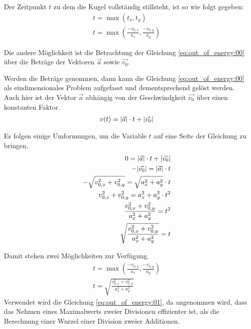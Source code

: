 Der Zeitpunkt $t$ zu dem die Kugel vollständig stillsteht, ist so wie folgt gegeben:
\begin{align}
    t = \max{(t_x, t_y)}\\
    t = \max{(\frac{-v_{0,x}}{a_x}, \frac{-v_{0,y}}{a_y})}
\end{align}

Die andere Möglichkeit ist die Betrachtung der Gleichung \ref{eq:out_of_energy:00} über die Beträge der Vektoren
$\vec{a}$ sowie $\vec{v_0}$.

Werden die Beträge genommen, dann kann die Gleichung \ref{eq:out_of_energy:00} als eindimensionales Problem aufgefasst und
dementsprechend gelöst werden. Auch hier ist der Vektor $\vec{a}$ abhängig von der Geschwindgkeit $\vec{v_0}$ über einen
konstanten Faktor.
\begin{align}
    v(t) = \lvert \vec{a} \rvert \cdot t + \lvert \vec{v_0} \rvert
\end{align}

Es folgen einige Umformungen, um die Variable $t$ auf eine Seite der Gleichung zu bringen.
\begin{align}
    0 = \lvert \vec{a} \rvert \cdot t + \lvert \vec{v_0} \rvert\\
    -\lvert \vec{v_0} \rvert = \lvert \vec{a} \rvert \cdot t\\
    -\sqrt{v_{0,x}^2 + v_{0,y}^2} = \sqrt{a_x^2 + a_y^2} \cdot t\\
    v_{0,x}^2 + v_{0,y}^2 = a_x^2 + a_y^2 \cdot t^2\\
    \frac{v_{0,x}^2 + v_{0,y}^2}{a_x^2 + a_y^2} = t^2\\
    \sqrt{\frac{v_{0,x}^2 + v_{0,y}^2}{a_x^2 + a_y^2}} = t
\end{align}

Damit stehen zwei Möglichkeiten zur Verfügung.
\begin{align}
    t = \max{(\frac{-v_{0,x}}{a_x}, \frac{-v_{0,y}}{a_y})}\\
    t = \sqrt{\frac{v_{0,x}^2 + v_{0,y}^2}{a_x^2 + a_y^2}}
\end{align}
Verwendet wird die Gleichung \ref{eq:out_of_energy:01}, da angenommen wird, dass das Nehmen eines Maximalwerts zweier
Divisionen effizienter ist, als die Berechnung einer Wurzel einer Division zweier Additionen.